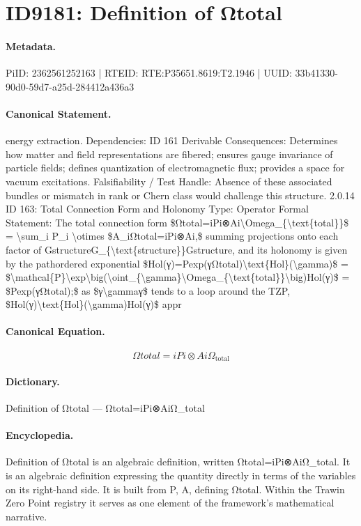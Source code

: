 \section*{ID9181: Definition of Ωtotal}
\paragraph{Metadata.}
PiID: 2362561252163 | RTEID: RTE:P35651.8619:T2.1946 | UUID: 33b41330-90d0-59d7-a25d-284412a436a3

\paragraph{Canonical Statement.}
energy extraction. Dependencies: ID 161 Derivable Consequences: Determines how matter and field representations are fibered; ensures gauge invariance of particle fields; defines quantization of electromagnetic flux; provides a space for vacuum excitations. Falsifiability / Test Handle: Absence of these associated bundles or mismatch in rank or Chern class would challenge this structure. 2.0.14 ID 163: Total Connection Form and Holonomy Type: Operator Formal Statement: The total connection form \$Ωtotal=iPi⊗Ai\textbackslash{}Omega\_\{\textbackslash{}text\{total\}\}\$ = \textbackslash{}sum\_i P\_i \textbackslash{}otimes \$A\_iΩtotal=iPi⊗Ai,\$ summing projections onto each factor of GstructureG\_\{\textbackslash{}text\{structure\}\}Gstructure, and its holonomy is given by the pathordered exponential \$Hol(γ)=Pexp(γΩtotal)\textbackslash{}text\{Hol\}(\textbackslash{}gamma)\$ = \$\textbackslash{}mathcal\{P\}\textbackslash{}exp\textbackslash{}big(\textbackslash{}oint\_\{\textbackslash{}gamma\}\textbackslash{}Omega\_\{\textbackslash{}text\{total\}\}\textbackslash{}big)Hol(γ)\$ = \$Pexp(γΩtotal);\$ as \$γ\textbackslash{}gammaγ\$ tends to a loop around the TZP, \$Hol(γ)\textbackslash{}text\{Hol\}(\textbackslash{}gamma)Hol(γ)\$ appr

\paragraph{Canonical Equation.}
\[
Ωtotal=iPi⊗Ai\Omega_{\text{total}}
\]

\paragraph{Dictionary.}
Definition of Ωtotal — Ωtotal=iPi⊗AiΩ\_total

\paragraph{Encyclopedia.}
Definition of Ωtotal is an algebraic definition, written Ωtotal=iPi⊗AiΩ\_total. It is an algebraic definition expressing the quantity directly in terms of the variables on its right-hand side. It is built from P, A, defining Ωtotal. Within the Trawin Zero Point registry it serves as one element of the framework's mathematical narrative.
